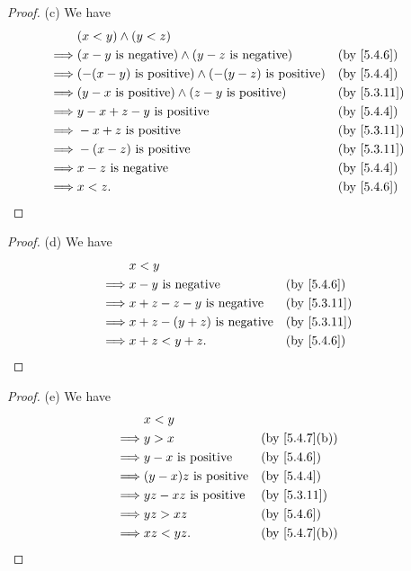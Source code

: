 \begin{proof}{(c)}
  We have
  \begin{align*}
             & (x < y) \land (y < z)                                                                \\
    \implies & (x - y \text{ is negative}) \land (y - z \text{ is negative})       &  & \by{5.4.6}  \\
    \implies & (-(x - y) \text{ is positive}) \land (-(y - z) \text{ is positive}) &  & \by{5.4.4}  \\
    \implies & (y - x \text{ is positive}) \land (z - y \text{ is positive})       &  & \by{5.3.11} \\
    \implies & y - x + z - y \text{ is positive}                                   &  & \by{5.4.4}  \\
    \implies & - x + z \text{ is positive}                                         &  & \by{5.3.11} \\
    \implies & -(x - z) \text{ is positive}                                        &  & \by{5.3.11} \\
    \implies & x - z \text{ is negative}                                           &  & \by{5.4.4}  \\
    \implies & x < z.                                                              &  & \by{5.4.6}
  \end{align*}
\end{proof}

\begin{proof}{(d)}
  We have
  \begin{align*}
             & x < y                                                \\
    \implies & x - y \text{ is negative}           &  & \by{5.4.6}  \\
    \implies & x + z - z - y \text{ is negative}   &  & \by{5.3.11} \\
    \implies & x + z - (y + z) \text{ is negative} &  & \by{5.3.11} \\
    \implies & x + z < y + z.                      &  & \by{5.4.6}
  \end{align*}
\end{proof}

\begin{proof}{(e)}
  We have
  \begin{align*}
             & x < y                                                         \\
    \implies & y > x                        &  & \text{(by \cref{5.4.7}(b))} \\
    \implies & y - x \text{ is positive}    &  & \by{5.4.6}                  \\
    \implies & (y - x)z \text{ is positive} &  & \by{5.4.4}                  \\
    \implies & yz - xz \text{ is positive}  &  & \by{5.3.11}                 \\
    \implies & yz > xz                      &  & \by{5.4.6}                  \\
    \implies & xz < yz.                     &  & \text{(by \cref{5.4.7}(b))}
  \end{align*}
\end{proof}

